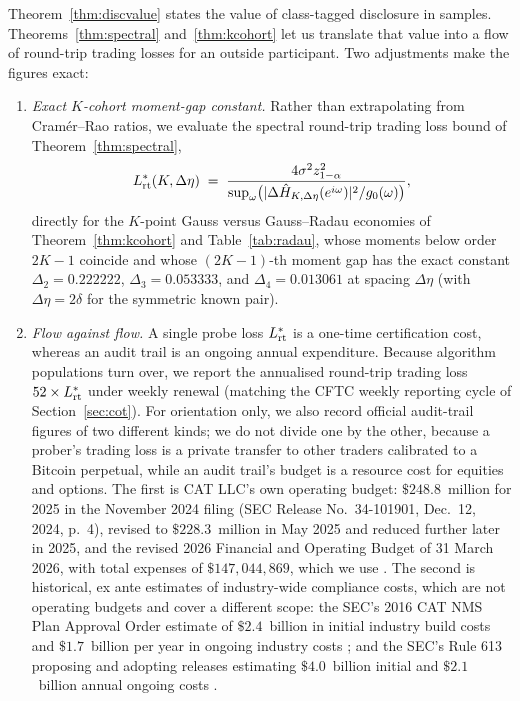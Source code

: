 \documentclass[12pt]{article}
\theoremstyle{definition}
\theoremstyle{remark}
\begin{document}
Theorem~\ref{thm:discvalue} states the value of class-tagged disclosure in samples. Theorems~\ref{thm:spectral} and~\ref{thm:kcohort} let us translate that value into a flow of round-trip trading losses for an outside participant. Two adjustments make the figures exact:
\begin{enumerate}[label=(\roman*),itemsep=1pt]
\item \emph{Exact $K$-cohort moment-gap constant.} Rather than extrapolating from Cram\'er--Rao ratios, we evaluate the spectral round-trip trading loss bound of Theorem~\ref{thm:spectral},
\[
L_{\rm rt}^*(K,\Delta\eta)\;=\;\frac{4\sigma^2 z_{1-\alpha}^2}{\sup_\omega\bigl(|\Delta\hat H_{K,\Delta\eta}(e^{i\omega})|^2/g_0(\omega)\bigr)},
\]
directly for the $K$-point Gauss versus Gauss--Radau economies of Theorem~\ref{thm:kcohort} and Table~\ref{tab:radau}, whose moments below order $2K-1$ coincide and whose $(2K-1)$-th moment gap has the exact constant $\Delta_2=0.222222$, $\Delta_3=0.053333$, and $\Delta_4=0.013061$ at spacing $\Delta\eta$ (with $\Delta\eta=2\delta$ for the symmetric known pair).
\item \emph{Flow against flow.} A single probe loss $L_{\rm rt}^*$ is a one-time certification cost, whereas an audit trail is an ongoing annual expenditure. Because algorithm populations turn over, we report the annualised round-trip trading loss $52\times L_{\rm rt}^*$ under weekly renewal (matching the CFTC weekly reporting cycle of Section~\ref{sec:cot}). For orientation only, we also record official audit-trail figures of two different kinds; we do not divide one by the other, because a prober's trading loss is a private transfer to other traders calibrated to a Bitcoin perpetual, while an audit trail's budget is a resource cost for equities and options. The first is CAT LLC's own operating budget: $\$248.8$~million for 2025 in the November 2024 filing (SEC Release No.\ 34-101901, Dec.\ 12, 2024, p.~4), revised to $\$228.3$~million in May 2025 and reduced further later in 2025, and the revised 2026 Financial and Operating Budget of 31 March 2026, with total expenses of $\$147{,}044{,}869$, which we use \citep{catbudget2026}. The second is historical, ex ante estimates of industry-wide compliance costs, which are not operating budgets and cover a different scope: the SEC's 2016 CAT NMS Plan Approval Order estimate of $\$2.4$~billion in initial industry build costs and $\$1.7$~billion per year in ongoing industry costs \citep[Release No.\ 34-79318, Nov.\ 15, 2016, 81 FR 84696 at 84801, p.~363]{sec2016}; and the SEC's Rule 613 proposing and adopting releases estimating $\$4.0$~billion initial and $\$2.1$~billion annual ongoing costs \citep[Release No.\ 34-62174, May 26, 2010, 75 FR 32556 at 32598, 32600, pp.~147, 153; Release No.\ 34-67457, July 18, 2012, 77 FR 45722 at 45790--45795, pp.~220--238]{sec2012}.
\end{enumerate}
\end{document}
